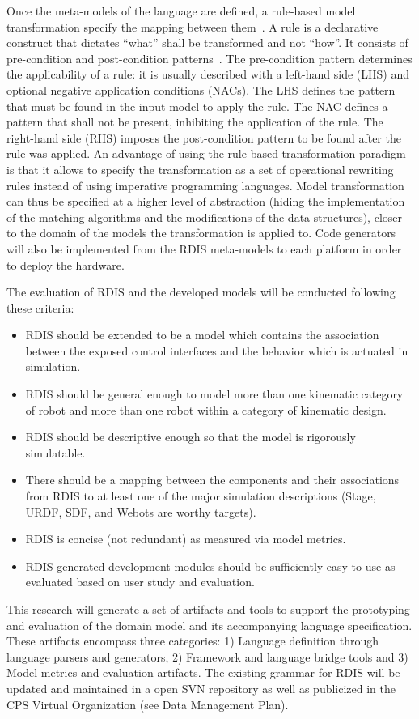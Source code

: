 Once the meta-models of the language are defined, a rule-based model transformation specify the mapping between them~\cite{Jouault2008}.
A rule is a declarative construct that dictates ``what'' shall be transformed and not ``how''.
It consists of pre-condition and post-condition patterns~\cite{Ehrig2006}.
The pre-condition pattern determines the applicability of a rule: it is usually described with a left-hand side (LHS) and optional negative application conditions (NACs).
The LHS defines the pattern that must be found in the input model to apply the rule.
The NAC defines a pattern that shall not be present, inhibiting the application of the rule.
The right-hand side (RHS) imposes the post-condition pattern to be found after the rule was applied.
An advantage of using the rule-based transformation paradigm is that it allows to specify the transformation as a set of operational rewriting rules instead of using imperative programming languages.
Model transformation can thus be specified at a higher level of abstraction (hiding the implementation of the matching algorithms and the modifications of the data structures), closer to the domain of the models the transformation is applied to.
Code generators will also be implemented from the RDIS meta-models to each platform in order to deploy the hardware.

The evaluation of RDIS and the developed models will be conducted following these criteria:
\vspace{-.5\baselineskip}%
\begin{itemize}
  \item RDIS should be extended to be a model which contains the association between the exposed control interfaces and the behavior which is actuated in
  simulation.
  \item RDIS should be general enough to model more than one kinematic category of robot and more than one robot within a category of kinematic design.
  \item RDIS should be descriptive enough so that the model is rigorously simulatable.
  \item There should be a mapping between the components and their associations from RDIS to at least one of the major simulation descriptions (Stage, URDF, SDF, and Webots are worthy targets).
  \item RDIS is concise (not redundant) as measured via model metrics.
  \item RDIS generated development modules should be sufficiently easy to use as evaluated based on user study and evaluation.
\end{itemize}

This research will generate a set of artifacts and tools to support the prototyping and evaluation of the domain model and its accompanying language specification.  These artifacts encompass three categories: 1) Language definition through language parsers and generators, 2) Framework and language bridge tools and 3) Model metrics and evaluation artifacts.  The existing grammar for RDIS will be updated and maintained in a open SVN repository as well as publicized in the CPS Virtual Organization (see Data Management Plan).\newline
